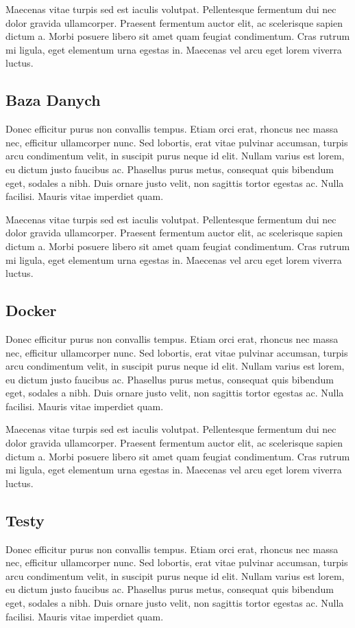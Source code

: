 \documentclass[times]{san}
\begin{document}
Maecenas vitae turpis sed est iaculis volutpat. Pellentesque fermentum dui nec dolor gravida ullamcorper. Praesent fermentum auctor elit, ac scelerisque sapien dictum a. Morbi posuere libero sit amet quam feugiat condimentum. Cras rutrum mi ligula, eget elementum urna egestas in. Maecenas vel arcu eget lorem viverra luctus.

\subsection{Baza Danych}
Donec efficitur purus non convallis tempus. Etiam orci erat, rhoncus nec massa nec, efficitur ullamcorper nunc. Sed lobortis, erat vitae pulvinar accumsan, turpis arcu condimentum velit, in suscipit purus neque id elit. Nullam varius est lorem, eu dictum justo faucibus ac. Phasellus purus metus, consequat quis bibendum eget, sodales a nibh. Duis ornare justo velit, non sagittis tortor egestas ac. Nulla facilisi. Mauris vitae imperdiet quam. 

Maecenas vitae turpis sed est iaculis volutpat. Pellentesque fermentum dui nec dolor gravida ullamcorper. Praesent fermentum auctor elit, ac scelerisque sapien dictum a. Morbi posuere libero sit amet quam feugiat condimentum. Cras rutrum mi ligula, eget elementum urna egestas in. Maecenas vel arcu eget lorem viverra luctus.

\subsection{Docker}
Donec efficitur purus non convallis tempus. Etiam orci erat, rhoncus nec massa nec, efficitur ullamcorper nunc. Sed lobortis, erat vitae pulvinar accumsan, turpis arcu condimentum velit, in suscipit purus neque id elit. Nullam varius est lorem, eu dictum justo faucibus ac. Phasellus purus metus, consequat quis bibendum eget, sodales a nibh. Duis ornare justo velit, non sagittis tortor egestas ac. Nulla facilisi. Mauris vitae imperdiet quam. 

Maecenas vitae turpis sed est iaculis volutpat. Pellentesque fermentum dui nec dolor gravida ullamcorper. Praesent fermentum auctor elit, ac scelerisque sapien dictum a. Morbi posuere libero sit amet quam feugiat condimentum. Cras rutrum mi ligula, eget elementum urna egestas in. Maecenas vel arcu eget lorem viverra luctus.

\subsection{Testy}
Donec efficitur purus non convallis tempus. Etiam orci erat, rhoncus nec massa nec, efficitur ullamcorper nunc. Sed lobortis, erat vitae pulvinar accumsan, turpis arcu condimentum velit, in suscipit purus neque id elit. Nullam varius est lorem, eu dictum justo faucibus ac. Phasellus purus metus, consequat quis bibendum eget, sodales a nibh. Duis ornare justo velit, non sagittis tortor egestas ac. Nulla facilisi. Mauris vitae imperdiet quam. 
\end{document}
